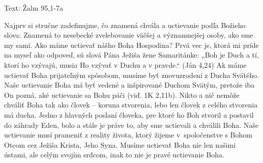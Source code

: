 







Text: Žalm 95,1-7a

Najprv si stručne zadefinujme, čo znamená chvála a uctievanie podľa Božieho slova: Znamená to nesebecké zvelebovanie väčšej a významnejšej osoby, ako sme my sami. Ako máme uctievať nášho Boha Hospodina? Prvá vec je, ktorá mi príde na myseľ ako odpoveď, sú slová Pána Ježiša žene Samaritánke: „Boh je Duch a tí, ktorí ho vzývajú, musia Ho vzývať v Duchu a v pravde.“ (Ján 4,24) Ak máme uctievať Boha prijateľným spôsobom, musíme byť znovuzrodení z Ducha Svätého. Naše uctievanie Boha má byť vedené a inšpirované Duchom Svätým, pretože iba On pozná, aké uctievanie sa Bohu páči (viď. 1K 2,11b). Nikto a nič nemôže chváliť Boha tak ako človek -- koruna stvorenia, lebo len človek z celého stvorenia má ducha. Jedno z hlavných poslaní človeka, pre ktoré ho Boh stvoril a postavil do záhrady Eden, bolo a stále je práve to, aby sme uctievali a chválili Boha. Naše uctievanie musí prameniť z reality života, ktorý žijeme v~spoločenstve s Bohom Otcom cez Ježiša Krista, Jeho Syna. Musíme uctievať Boha nie len našimi ústami, ale celým svojím srdcom, inak to nie je pravé uctievanie Boha.

